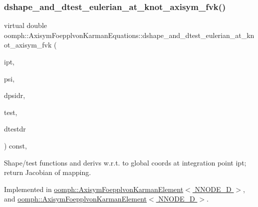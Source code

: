 \subsubsection{\texorpdfstring{dshape\+\_\+and\+\_\+dtest\+\_\+eulerian\+\_\+at\+\_\+knot\+\_\+axisym\+\_\+fvk()}{dshape\_and\_dtest\_eulerian\_at\_knot\_axisym\_fvk()}\hspace{0.1cm}{\footnotesize\ttfamily [1/2]}}
{\footnotesize\ttfamily virtual double oomph\+::\+Axisym\+Foepplvon\+Karman\+Equations\+::dshape\+\_\+and\+\_\+dtest\+\_\+eulerian\+\_\+at\+\_\+knot\+\_\+axisym\+\_\+fvk (\begin{DoxyParamCaption}\item[{const unsigned \&}]{ipt,  }\item[{\hyperlink{classoomph_1_1Shape}{Shape} \&}]{psi,  }\item[{\hyperlink{classoomph_1_1DShape}{D\+Shape} \&}]{dpsidr,  }\item[{\hyperlink{classoomph_1_1Shape}{Shape} \&}]{test,  }\item[{\hyperlink{classoomph_1_1DShape}{D\+Shape} \&}]{dtestdr }\end{DoxyParamCaption}) const\hspace{0.3cm}{\ttfamily [protected]}, {}}



Shape/test functions and derivs w.\+r.\+t. to global coords at integration point ipt; return Jacobian of mapping. 



Implemented in \hyperlink{classoomph_1_1AxisymFoepplvonKarmanElement_a20841d263ec4590d5614d43f2f813ae7}{oomph\+::\+Axisym\+Foepplvon\+Karman\+Element$<$ N\+N\+O\+D\+E\+\_\+D $>$}, and \hyperlink{classoomph_1_1AxisymFoepplvonKarmanElement_a20841d263ec4590d5614d43f2f813ae7}{oomph\+::\+Axisym\+Foepplvon\+Karman\+Element$<$ N\+N\+O\+D\+E\+\_\+D $>$}.

\mbox{\label{classoomph_1_1AxisymFoepplvonKarmanEquations_a456a9c27c326d6d1e55e3ab822ac1a5f}} 
